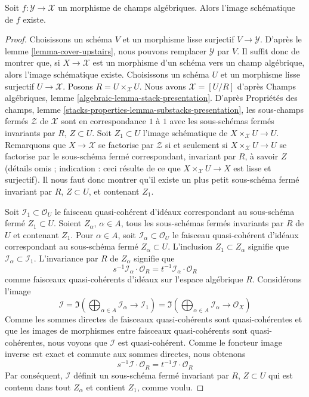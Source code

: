 \begin{lemma}
\label{lemma-scheme-theoretic-image-existence}
Soit $f : \mathcal{Y} \to \mathcal{X}$ un morphisme de champs algébriques.
Alors l'image schématique de $f$ existe.
\end{lemma}

\begin{proof}
Choisissons un schéma $V$ et un morphisme lisse surjectif $V \to \mathcal{Y}$.
D'après le lemme \ref{lemma-cover-upstairs}, nous pouvons remplacer $\mathcal{Y}$ par $V$.
Il suffit donc de montrer que, si $X \to \mathcal{X}$ est un morphisme d'un
schéma vers un champ algébrique, alors l'image schématique existe.
Choisissons un schéma $U$ et un morphisme lisse surjectif $U \to \mathcal{X}$.
Posons $R = U \times_\mathcal{X} U$.
Nous avons $\mathcal{X} = [U/R]$ d'après
Champs algébriques, lemme \ref{algebraic-lemma-stack-presentation}.
D'après Propriétés des champs, lemme
\ref{stacks-properties-lemma-substacks-presentation},
les sous-champs fermés $\mathcal{Z}$ de $\mathcal{X}$
sont en correspondance $1$ à $1$ avec les sous-schémas fermés invariants
par $R$, $Z \subset U$.
Soit $Z_1 \subset U$ l'image schématique de
$X \times_\mathcal{X} U \to U$.
Remarquons que $X \to \mathcal{X}$ se factorise par $\mathcal{Z}$
si et seulement si $X \times_\mathcal{X} U \to U$ se factorise par
le sous-schéma fermé correspondant, invariant par $R$, à savoir $Z$
(détails omis ; indication : ceci résulte de ce que
$X \times_\mathcal{X} U \to X$ est lisse et surjectif).
Il nous faut donc montrer qu'il existe un plus petit sous-schéma fermé
invariant par $R$, $Z \subset U$, et contenant $Z_1$.

\medskip\noindent
Soit $\mathcal{I}_1 \subset \mathcal{O}_U$ le faisceau quasi-cohérent
d'idéaux correspondant au sous-schéma fermé $Z_1 \subset U$.
Soient $Z_\alpha$, $\alpha \in A$, tous les sous-schémas fermés invariants
par $R$ de $U$ et contenant $Z_1$.
Pour $\alpha \in A$, soit $\mathcal{I}_\alpha \subset \mathcal{O}_U$
le faisceau quasi-cohérent d'idéaux correspondant au sous-schéma fermé
$Z_\alpha \subset U$. L'inclusion $Z_1 \subset Z_\alpha$
signifie que $\mathcal{I}_\alpha \subset \mathcal{I}_1$.
L'invariance par $R$ de $Z_\alpha$ signifie que
$$
s^{-1}\mathcal{I}_\alpha \cdot \mathcal{O}_R =
t^{-1}\mathcal{I}_\alpha \cdot \mathcal{O}_R
$$
comme faisceaux quasi-cohérents d'idéaux sur l'espace algébrique $R$.
Considérons l'image
$$
\mathcal{I} =
\Im\left(
\bigoplus\nolimits_{\alpha \in A} \mathcal{I}_\alpha \to \mathcal{I}_1
\right) =
\Im\left(
\bigoplus\nolimits_{\alpha \in A} \mathcal{I}_\alpha \to \mathcal{O}_X
\right)
$$
Comme les sommes directes de faisceaux quasi-cohérents sont quasi-cohérentes
et que les images de morphismes entre faisceaux quasi-cohérents sont
quasi-cohérentes, nous voyons que $\mathcal{I}$ est quasi-cohérent.
Comme le foncteur image inverse est exact et commute aux sommes directes, nous obtenons
$$
s^{-1}\mathcal{I} \cdot \mathcal{O}_R =
t^{-1}\mathcal{I} \cdot \mathcal{O}_R
$$
Par conséquent, $\mathcal{I}$ définit un sous-schéma fermé invariant par $R$,
$Z \subset U$ qui est contenu dans tout $Z_\alpha$ et contient
$Z_1$, comme voulu.
\end{proof}

